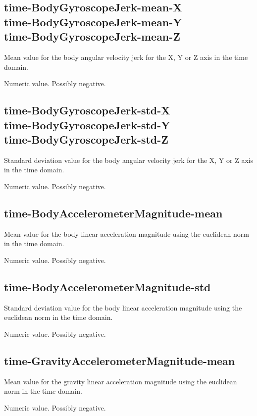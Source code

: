 \documentclass[a4paper,10pt]{report}
\begin{document}
\subsection*{time-BodyGyroscopeJerk-mean-X\\time-BodyGyroscopeJerk-mean-Y\\time-BodyGyroscopeJerk-mean-Z} 

Mean value for the body angular velocity jerk for the X, Y or Z axis in the time domain.

Numeric value. Possibly negative.

\subsection*{time-BodyGyroscopeJerk-std-X\\time-BodyGyroscopeJerk-std-Y\\time-BodyGyroscopeJerk-std-Z} 

Standard deviation value for the body angular velocity jerk for the X, Y or Z axis in the time domain.

Numeric value. Possibly negative.

\subsection*{time-BodyAccelerometerMagnitude-mean} 

Mean value for the body linear acceleration magnitude using the euclidean norm in the time domain.

Numeric value. Possibly negative.

\subsection*{time-BodyAccelerometerMagnitude-std} 

Standard deviation value for the body linear acceleration magnitude using the euclidean norm in the time domain.

Numeric value. Possibly negative.

\subsection*{time-GravityAccelerometerMagnitude-mean} 

Mean value for the gravity linear acceleration magnitude using the euclidean norm in the time domain.

Numeric value. Possibly negative.
\end{document}
